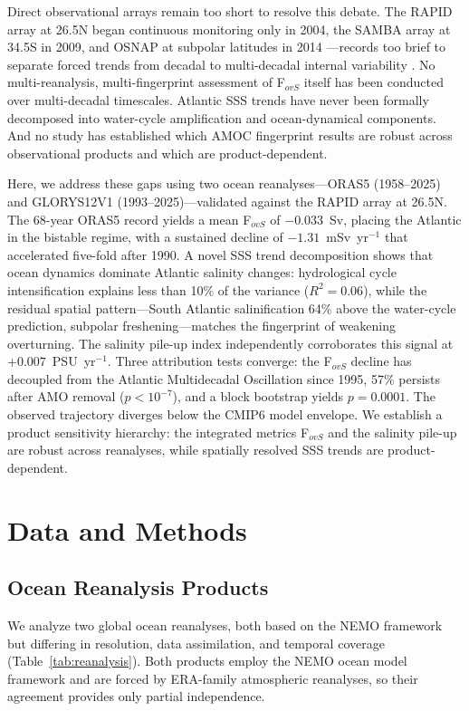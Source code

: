 \documentclass{agujournal2019}
\begin{document}
Direct observational arrays remain too short to resolve this debate. The RAPID array at 26.5\textdegree N began continuous monitoring only in 2004, the SAMBA array at 34.5\textdegree S in 2009, and OSNAP at subpolar latitudes in 2014 \cite{Cunningham2007,Meinen2018}---records too brief to separate forced trends from decadal to multi-decadal internal variability \cite{Wunsch2018}. No multi-reanalysis, multi-fingerprint assessment of F$_{ovS}$ itself has been conducted over multi-decadal timescales. Atlantic SSS trends have never been formally decomposed into water-cycle amplification and ocean-dynamical components. And no study has established which AMOC fingerprint results are robust across observational products and which are product-dependent.

Here, we address these gaps using two ocean reanalyses---ORAS5 (1958--2025) and GLORYS12V1 (1993--2025)---validated against the RAPID array at 26.5\textdegree N. The 68-year ORAS5 record yields a mean F$_{ovS}$ of $-0.033$~Sv, placing the Atlantic in the bistable regime, with a sustained decline of $-1.31$~mSv~yr$^{-1}$ that accelerated five-fold after 1990. A novel SSS trend decomposition shows that ocean dynamics dominate Atlantic salinity changes: hydrological cycle intensification explains less than 10\% of the variance ($R^2 = 0.06$), while the residual spatial pattern---South Atlantic salinification 64\% above the water-cycle prediction, subpolar freshening---matches the fingerprint of weakening overturning. The salinity pile-up index independently corroborates this signal at $+0.007$~PSU~yr$^{-1}$. Three attribution tests converge: the F$_{ovS}$ decline has decoupled from the Atlantic Multidecadal Oscillation since 1995, 57\% persists after AMO removal ($p < 10^{-7}$), and a block bootstrap yields $p = 0.0001$. The observed trajectory diverges below the CMIP6 model envelope. We establish a product sensitivity hierarchy: the integrated metrics F$_{ovS}$ and the salinity pile-up are robust across reanalyses, while spatially resolved SSS trends are product-dependent.


\section{Data and Methods}

\subsection{Ocean Reanalysis Products}

We analyze two global ocean reanalyses, both based on the NEMO framework but differing in resolution, data assimilation, and temporal coverage (Table~\ref{tab:reanalysis}). Both products employ the NEMO ocean model framework and are forced by ERA-family atmospheric reanalyses, so their agreement provides only partial independence.
\end{document}
